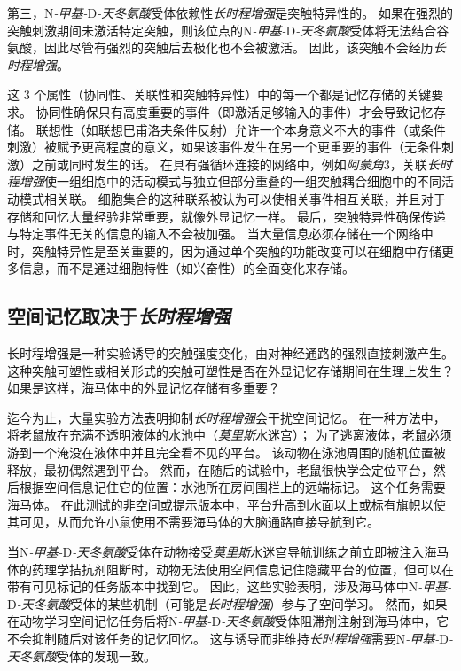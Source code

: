第三，N\textit{-甲基-}D\textit{-天冬氨酸}受体依赖性\textit{长时程增强}是突触特异性的。
如果在强烈的突触刺激期间未激活特定突触，则该位点的N\textit{-甲基-}D\textit{-天冬氨酸}受体将无法结合谷氨酸，因此尽管有强烈的突触后去极化也不会被激活。
因此，该突触不会经历\textit{长时程增强}。


这 3 个属性（协同性、关联性和突触特异性）中的每一个都是记忆存储的关键要求。
协同性确保只有高度重要的事件（即激活足够输入的事件）才会导致记忆存储。
联想性（如联想巴甫洛夫条件反射）允许一个本身意义不大的事件（或条件刺激）被赋予更高程度的意义，如果该事件发生在另一个更重要的事件（无条件刺激）之前或同时发生的话。
在具有强循环连接的网络中，例如\textit{阿蒙角}3，关联\textit{长时程增强}使一组细胞中的活动模式与独立但部分重叠的一组突触耦合细胞中的不同活动模式相关联。
细胞集合的这种联系被认为可以使相关事件相互关联，并且对于存储和回忆大量经验非常重要，就像外显记忆一样。
最后，突触特异性确保传递与特定事件无关的信息的输入不会被加强。
当大量信息必须存储在一个网络中时，突触特异性是至关重要的，因为通过单个突触的功能改变可以在细胞中存储更多信息，而不是通过细胞特性（如兴奋性）的全面变化来存储。



\subsection{空间记忆取决于\textit{长时程增强}}

长时程增强是一种实验诱导的突触强度变化，由对神经通路的强烈直接刺激产生。
这种突触可塑性或相关形式的突触可塑性是否在外显记忆存储期间在生理上发生？
如果是这样，海马体中的外显记忆存储有多重要？


迄今为止，大量实验方法表明抑制\textit{长时程增强}会干扰空间记忆。
在一种方法中，将老鼠放在充满不透明液体的水池中（\textit{莫里斯}水迷宫）；
为了逃离液体，老鼠必须游到一个淹没在液体中并且完全看不见的平台。
该动物在泳池周围的随机位置被释放，最初偶然遇到平台。
然而，在随后的试验中，老鼠很快学会定位平台，然后根据空间信息记住它的位置：水池所在房间围栏上的远端标记。
这个任务需要海马体。
在此测试的非空间或提示版本中，平台升高到水面以上或标有旗帜以使其可见，从而允许小鼠使用不需要海马体的大脑通路直接导航到它。


当N\textit{-甲基-}D\textit{-天冬氨酸}受体在动物接受\textit{莫里斯}水迷宫导航训练之前立即被注入海马体的药理学拮抗剂阻断时，动物无法使用空间信息记住隐藏平台的位置，但可以在带有可见标记的任务版本中找到它。
因此，这些实验表明，涉及海马体中N\textit{-甲基-}D\textit{-天冬氨酸}受体的某些机制（可能是\textit{长时程增强}）参与了空间学习。
然而，如果在动物学习空间记忆任务后将N\textit{-甲基-}D\textit{-天冬氨酸}受体阻滞剂注射到海马体中，它不会抑制随后对该任务的记忆回忆。
这与诱导而非维持\textit{长时程增强}需要N\textit{-甲基-}D\textit{-天冬氨酸}受体的发现一致。


